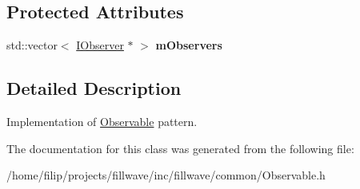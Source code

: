 \subsection*{Protected Attributes}
\begin{DoxyCompactItemize}
\item 
\mbox{\label{classflw_1_1flf_1_1Observable_ab2195183e9d1cb1c5918cfccda9bbf49}} 
std\+::vector$<$ \hyperlink{classflw_1_1flf_1_1IObserver}{I\+Observer} $\ast$ $>$ {\bfseries m\+Observers}
\end{DoxyCompactItemize}


\subsection{Detailed Description}
Implementation of \hyperlink{classflw_1_1flf_1_1Observable}{Observable} pattern. 

The documentation for this class was generated from the following file\+:\begin{DoxyCompactItemize}
\item 
/home/filip/projects/fillwave/inc/fillwave/common/Observable.\+h\end{DoxyCompactItemize}
